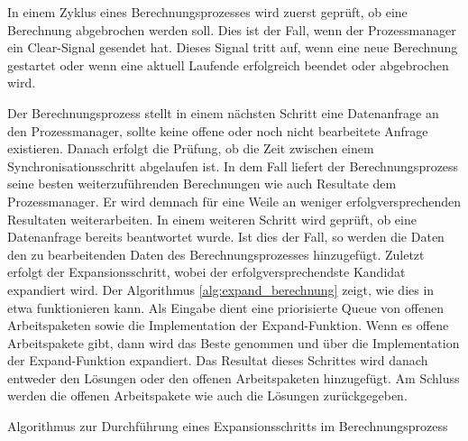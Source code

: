 In einem Zyklus eines Berechnungsprozesses wird zuerst geprüft, ob eine Berechnung abgebrochen werden soll. Dies ist der
Fall, wenn der Prozessmanager ein \glqq Clear-Signal\grqq{} gesendet hat. Dieses Signal tritt auf, wenn eine neue
Berechnung gestartet oder wenn eine aktuell Laufende erfolgreich beendet oder abgebrochen wird.

Der Berechnungsprozess stellt in einem nächsten Schritt eine Datenanfrage an den Prozessmanager, sollte keine offene oder
noch nicht bearbeitete Anfrage existieren. Danach erfolgt die Prüfung, ob die Zeit zwischen einem Synchronisationsschritt
abgelaufen ist. In dem Fall liefert der Berechnungsprozess seine besten weiterzuführenden Berechnungen wie auch Resultate
dem Prozessmanager. Er wird demnach für eine Weile an weniger erfolgversprechenden Resultaten weiterarbeiten. In einem
weiteren Schritt wird geprüft, ob eine Datenanfrage bereits beantwortet wurde. Ist dies der Fall, so werden die
Daten den zu bearbeitenden Daten des Berechnungsprozesses hinzugefügt. Zuletzt erfolgt der Expansionsschritt, wobei der
erfolgversprechendste Kandidat expandiert wird.
Der Algorithmus \ref{alg:expand_berechnung} zeigt, wie dies in etwa funktionieren kann.
Als Eingabe dient eine priorisierte Queue von offenen Arbeitspaketen sowie die Implementation der \glqq Expand-Funktion\grqq.
Wenn es offene Arbeitspakete gibt, dann wird das Beste genommen und über die Implementation der
\glqq Expand-Funktion\grqq{} expandiert. Das Resultat dieses Schrittes wird danach entweder den Lösungen oder den
offenen Arbeitspaketen hinzugefügt. Am Schluss werden die offenen Arbeitspakete wie auch die Lösungen zurückgegeben.

\begin{algorithm}[H]
    \DontPrintSemicolon
    \caption{Algorithmus zur Durchführung eines Expansionsschritts im Berechnungsprozess}
    \label{alg:expand_berechnung}
\end{algorithm}

